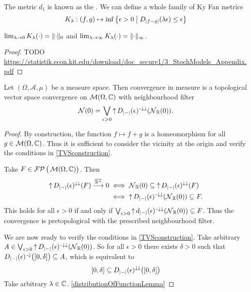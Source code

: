 \begin{definition}
The metric $d_1$ is known as the . We can define a whole family of Ky Fan metrics
\[ K_\lambda: (f,g) \mapsto \inf\setbuilder[\big]{\epsilon > 0}{D_{|f-g|}(\lambda\epsilon) \leq \epsilon} \]
\end{definition}

\begin{proposition}
$\lim_{\lambda\to 0}K_\lambda(\cdot) = \lVert\cdot\rVert_0$ and $\lim_{\lambda\to \infty}K_\lambda(\cdot) = \lVert\cdot\rVert_\infty$.
\end{proposition}
\begin{proof}
TODO \url{https://statistik.econ.kit.edu/download/doc_secure1/3_StochModels_Appendix.pdf}
\end{proof}

\begin{lemma}
Let $(\Omega, \mathcal{A}, \mu)$ be a measure space. Then convergence in measure is a topological vector space convergence on $\operatorname{\mathcal{M}}(\Omega,\mathbb{C})$ with neighbourhood filter
\[ \operatorname{\mathcal{N}}(0) = \bigvee_{\epsilon > 0}\operatorname{\uparrow} D_{|-|}(\epsilon)^{{\text{\hspace{0.15em}-}\downarrow}\downarrow}(\operatorname{\mathcal{N}}_{\mathbb{R}}(0)). \]
\end{lemma}
\begin{proof}
By construction, the function $f\mapsto f+g$ is a homeomorphism for all $g\in \operatorname{\mathcal{M}}(\Omega, \mathbb{C})$. Thus it is sufficient to consider the vicinity at the origin and verify the conditions in \ref{TVSconstruction}.

Take $F\in\operatorname{\mathcal{FP}}\big(\operatorname{\mathcal{M}}(\Omega,\mathbb{C})\big)$. Then
\begin{align*}
\operatorname{\uparrow} D_{|-|}(\epsilon)^{\downarrow\downarrow}(F) \overset{\overline{\mathbb{R}^+}}{\longrightarrow} 0 &\iff \operatorname{\mathcal{N}}_{\mathbb{R}}(0) \subseteq \operatorname{\uparrow} D_{|-|}(\epsilon)^{\downarrow\downarrow}(F) \\
&\iff \operatorname{\uparrow} D_{|-|}(\epsilon)^{{\text{\hspace{0.15em}-}\downarrow}\downarrow}(\operatorname{\mathcal{N}}_{\mathbb{R}}(0)) \subseteq F.
\end{align*}
This holds for all $\epsilon > 0$ if and only if $\bigvee_{\epsilon>0}\operatorname{\uparrow} d_{|-|}(\epsilon)^{{\text{\hspace{0.15em}-}\downarrow}\downarrow}(\operatorname{\mathcal{N}}_{\mathbb{R}}(0)) \subseteq F$. Thus the convergence is pretopological with the prescribed neighbourhood filter.

We are now ready to verify the conditions in \ref{TVSconstruction}. Take arbitrary $A\in \bigvee_{\epsilon>0}\operatorname{\uparrow} D_{|-|}(\epsilon)^{{\text{\hspace{0.15em}-}\downarrow}\downarrow}(\operatorname{\mathcal{N}}_{\mathbb{R}}(0))$. So for all $\epsilon > 0$ there exists $\delta > 0$ such that $D_{|-|}(\epsilon)^{\preimf}\big(\interval{0,\delta}\big) \subseteq A$, which is equivalent to
\[ \interval{0,\delta} \subseteq D_{|-|}(\epsilon)^{\imf\imf}\big(\interval{0,\delta}\big) \]
Take arbitrary $\lambda\in \mathbb{C}$. \ref{distributionOfFunctionLemma}
\end{proof}


